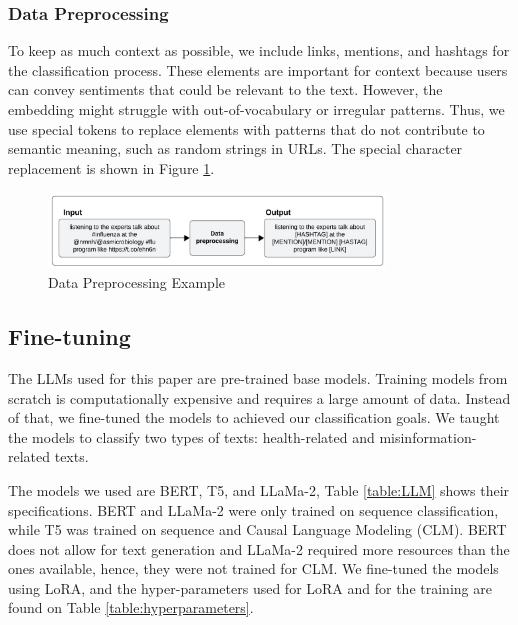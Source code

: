 \subsubsection{Data Preprocessing}
To keep as much context as possible, we include links, mentions, and hashtags for the classification process. These elements are important for context because users can convey sentiments that could be relevant to the text.
However, the embedding might struggle with out-of-vocabulary or irregular patterns. Thus, we use special tokens to replace elements with patterns that do not contribute
to semantic meaning, such as random strings in URLs. The special character replacement is shown in Figure \ref{fig:dpe}.

\begin{figure}[htbp]
	\begin{center}
		\includegraphics[width=0.8\textwidth]{figures/Data_preprocess_example.png}
	\end{center}
	\caption{Data Preprocessing Example}
	\label{fig:dpe}
\end{figure}

\vspace{-0.55em}
\subsection{Fine-tuning}
The LLMs used for this paper are pre-trained base models. Training models from scratch is computationally expensive and requires a large amount of data. Instead of that, we fine-tuned the models to achieved our classification goals. We taught the models to classify two types of texts: health-related and misinformation-related texts. 

The models we used  are BERT, T5, and LLaMa-2, Table \ref{table:LLM} shows their specifications. 
BERT and LLaMa-2 were only trained on sequence classification, while T5 was trained on sequence and Causal Language Modeling (CLM). BERT  does not allow for text generation and LLaMa-2 required more resources than the ones available, hence, they were not trained for CLM.  We fine-tuned the models using LoRA, and the hyper-parameters used for LoRA and for the training are found on Table \ref{table:hyperparameters}. 

